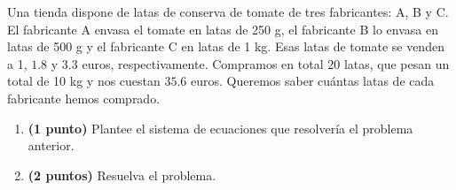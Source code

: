 
Una tienda dispone de latas de conserva de tomate de tres fabricantes: A, B y C. El fabricante A envasa el tomate en latas de 250 g, el fabricante B lo envasa en latas de 500 g y el fabricante C en latas de 1 kg. Esas latas de tomate se venden a 1, $1.8$ y $3.3$ euros, respectivamente. Compramos en total 20 latas, que pesan un total de 10 kg y nos cuestan $35.6$ euros. Queremos saber cuántas latas de cada fabricante hemos comprado.
\begin{enumerate}[label=\alph*)]
\item \textbf{(1 punto)} Plantee el sistema de ecuaciones que resolvería el problema anterior.
\item \textbf{(2 puntos)} Resuelva el problema.
\end{enumerate}
